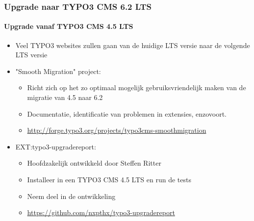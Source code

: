 
\begin{frame}[fragile]
	\frametitle{Upgrade naar TYPO3 CMS 6.2 LTS}
	\framesubtitle{Upgrade vanaf TYPO3 CMS 4.5 LTS}

	\begin{itemize}
		\item Veel TYPO3 websites zullen gaan van de huidige LTS versie naar de volgende LTS versie
		\item "Smooth Migration" project:

			\begin{itemize}
				\item Richt zich op het zo optimaal mogelijk gebruiksvriendelijk maken van de migratie van 4.5 naar 6.2
				\item Documentatie, identificatie van problemen in extensies, enzovoort.
				\item \smaller\url{http://forge.typo3.org/projects/typo3cms-smoothmigration}\normalsize
			\end{itemize}

		\item EXT:typo3-upgradereport:

			\begin{itemize}
				\item Hoofdzakelijk ontwikkeld door Steffen Ritter
				\item Installeer in een TYPO3 CMS 4.5 LTS en run de tests
				\item Neem deel in de ontwikkeling
				\item \smaller\url{https://github.com/nxpthx/typo3-upgradereport}\normalsize
			\end{itemize}
	\end{itemize}

\end{frame}


